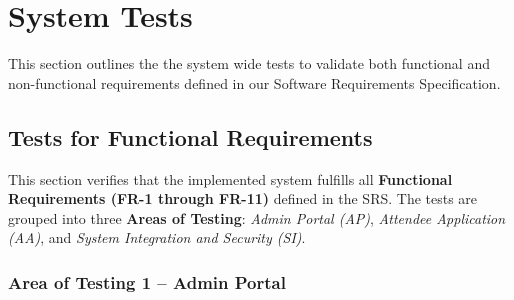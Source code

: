 \documentclass[12pt, titlepage]{article}
\begin{document}
\section{System Tests}

This section outlines the the system wide tests to validate both functional and non-functional requirements defined in our Software Requirements Specification.

\subsection{Tests for Functional Requirements}

This section verifies that the implemented system fulfills all \textbf{Functional Requirements (FR-1 through FR-11)} defined in the SRS. 
The tests are grouped into three \textbf{Areas of Testing}: \textit{Admin Portal (AP)}, \textit{Attendee Application (AA)}, and \textit{System Integration and Security (SI)}. 
\subsubsection{Area of Testing 1 – Admin Portal}
\end{document}
